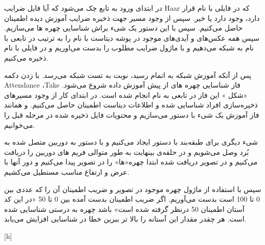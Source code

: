 در ابتدای ورود به تابع  چک می‌شود که آیا فایل ضرایب Haar که در فایلی با نام  قرار دارد، وجود دارد یا خیر.
سپس از وجود مسیر جهت ذخیره ضرایب آموزش دیده اطمینان حاصل می‌کنیم.
سپس با این دستور  یک شیء براش شناسایی چهره ها می‌سازیم. سپس همه عکس‌های و آیدی‌های موجود در پوشه دیتاست با نام  را به ترتیب در تابعی با نام  به شبکه می‌دهیم و با ماژول  ضرایب مطلوب را بدست می‌اوریم و در فایلی با نام  ذخیره می‌کنیم.


پس از آنکه آموزش شبکه به اتمام رسید، نوبت به تست شبکه می‌رسد. با زدن دکمه Attendance ،Take فاز شناسایی چهره های از پیش آموزش داده شروع می‌شود. «شکل » این فاز در تابعی به نام  انجام شده است. در ابتدای کار از وجود مسیر‌های ذخیره‌سازی افراد شناسایی شده و اطلاعات دیتاست اطمینان حاصل می‌کنیم. و همانند فاز آموزش یک شیء با دستور  می‌سازیم و محتویات فایل  ذخیره شده در مرحله قبل را می‌خوانیم. 

شیء دیگری برای طبقه‌بند با دستور  ایجاد می‌کنیم و با دستور  به دوربین متصل شده به بُرد وصل می‌شویم و در حلقه‌ی بینهایت به طور متوالی فریم های دوربین را دریافت می‌کنیم و در تصویر دریافت شده ابتدا چهره«ها» را در تصویر پیدا می‌کنیم و دور آنها با عرض و ارتفاع مناسب مستطیل می‌کشیم.

سپس با استفاده از ماژول  چهره موجود در تصویر و ضریب اطمینان آن را که عددی بین 0 تا 100 است بدست می‌آوریم. اگر ضریب اطمینان بدست آمده بین 0 تا 50 «در این کد آستان اطمینان 50 درنظر گرفته شده است» باشد چهره به درستی شناسایی شده است. هر چقدر مقدار این آستانه را بالا تر ببرین خطا در شناسایی افزایش می‌یابد.

[h]
